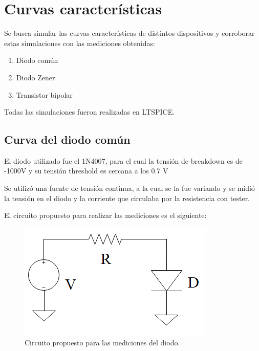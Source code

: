 \documentclass[../../e1_tp1_main.tex]{subfiles}
\begin{document}
\chapter{Curvas características}
Se busca simular las curvas características de distintos dispositivos y corroborar estas simulaciones con las mediciones obtenidas:

\begin{enumerate}
	\item Diodo común
	\item Diodo Zener
	\item Transistor bipolar
\end{enumerate}

Todas las simulaciones fueron realizadas en LTSPICE. 

\section{Curva del diodo común}
	El diodo utilizado fue el 1N4007, para el cual la tensión de breakdown es de -1000V y su tensión threshold es cercana a los 0.7 V\par
		Se utilizó una fuente de tensión continua, a la cual se la fue variando y se midió la tensión en el diodo y la corriente que circulaba por la resistencia con tester.\par
	El circuito propuesto para realizar las mediciones es el siguiente:
	
	\begin{figure}[H]	%
		\centering
		\includegraphics[scale=1.2]{imagenes/circuito_diode.png}
		\caption{Circuito propuesto para las mediciones del diodo.}
		\label{fig:ej5_circuito_diode}
	\end{figure}
\end{document}
